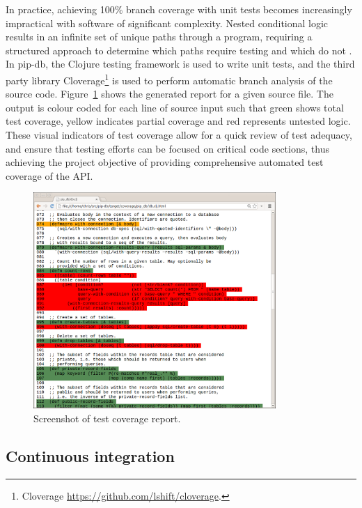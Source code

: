 In practice, achieving 100\% branch coverage with unit tests becomes
increasingly impractical with software of significant
complexity. Nested conditional logic results in an infinite set of
unique paths through a program, requiring a structured approach to
determine which paths require testing and which do not
\cite{woodward1980experience}. In pip-db, the Clojure testing
framework is used to write unit tests, and the third party library
Cloverage\footnote{Cloverage
  \url{https://github.com/lshift/cloverage}.} is used to perform
automatic branch analysis of the source
code. Figure~\ref{fig:cloverage} shows the generated report for a
given source file. The output is colour coded for each line of source
input such that green shows total test coverage, yellow indicates
partial coverage and red represents untested logic. These visual
indicators of test coverage allow for a quick review of test adequacy,
and ensure that testing efforts can be focused on critical code
sections, thus achieving the project objective of providing
comprehensive automated test coverage of the API.


\begin{figure}[H]
\centering
    \includegraphics[width=0.82\textwidth]{assets/cloverage}
\caption[Screenshot of test coverage report]
        {Screenshot of test coverage report.}
\label{fig:cloverage}
\end{figure}


\newpage
\subsection{Continuous integration}\label{subsec:ci}

